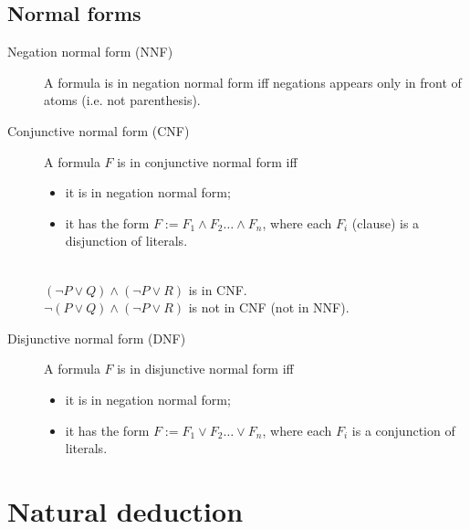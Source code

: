 \subsection{Normal forms}
\begin{description}
    \item[Negation normal form (NNF)] 
        A formula is in negation normal form iff negations appears only in front of atoms (i.e. not parenthesis).
        
    \item[Conjunctive normal form (CNF)] 
        A formula $F$ is in conjunctive normal form iff 
        \begin{itemize}
            \item it is in negation normal form;
            \item it has the form $F := F_1 \land F_2 \dots \land F_n$, where each $F_i$ (clause) is a disjunction of literals.
        \end{itemize}

        \begin{example} \phantom{}\\
            $(\lnot P \vee Q) \land (\lnot P \vee R)$ is in CNF.\\
            $\lnot(P \vee Q) \land (\lnot P \vee R)$ is not in CNF (not in NNF).
        \end{example}

    \item[Disjunctive normal form (DNF)] 
        A formula $F$ is in disjunctive normal form iff 
        \begin{itemize}
            \item it is in negation normal form;
            \item it has the form $F := F_1 \vee F_2 \dots \vee F_n$, where each $F_i$ is a conjunction of literals.
        \end{itemize}
\end{description}

\section{Natural deduction}


